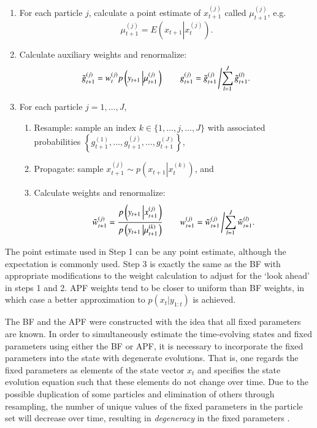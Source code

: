 \documentclass{elsarticle}
\begin{document}
\begin{enumerate}
\item For each particle $j$, calculate a point estimate of $x_{t+1}^{(j)}$ called $\mu_{t+1}^{(j)}$, e.g.
\[ \mu_{t+1}^{(j)} = E\left(x_{t+1}\left|x_t^{(j)} \right.\right). \]
\item Calculate auxiliary weights and renormalize:
\[ \tilde{g}_{t+1}^{(j)} = w_t^{(j)} p\left(y_{t+1}\left|\mu_{t+1}^{(j)}\right.\right) \qquad g_{t+1}^{(j)} = \tilde{g}_{t+1}^{(j)}\left/\sum_{l=1}^J \tilde{g}_{t+1}^{(l)}.\right. \]
\item For each particle $j=1,\ldots,J$,
	\begin{enumerate}
    \item Resample: sample an index $k\in\{1,\ldots,j,\ldots,J\}$ with associated probabilities $\left\{g_{t+1}^{(1)},\ldots,g_{t+1}^{(j)},\ldots,g_{t+1}^{(J)}\right\}$,
	\item Propagate: sample $x_{t+1}^{(j)} \sim p\left(x_{t+1}\left|x_t^{(k)}\right.\right)$, and
	\item Calculate weights and renormalize:
\[ \tilde{w}_{t+1}^{(j)} = \frac{p\left(y_{t+1}\left|x_{t+1}^{(j)}\right.\right)}{p\left(y_{t+1}\left|\mu_{t+1}^{(k)}\right.\right)} \qquad w_{t+1}^{(j)} = \tilde{w}_{t+1}^{(j)}\left/\sum_{l=1}^J \tilde{w}_{t+1}^{(l)}. \right. \]
	\end{enumerate}
\end{enumerate}

\noindent The point estimate used in Step 1 can be any point estimate, although the expectation is commonly used. Step 3 is exactly the same as the BF with appropriate modifications to the weight calculation to adjust for the `look ahead' in steps 1 and 2. APF weights tend to be closer to uniform than BF weights, in which case a better approximation to $p(x_{t}|y_{1:t})$ is achieved.

The BF and the APF were constructed with the idea that all fixed parameters are known. In order to simultaneously estimate the time-evolving states and fixed parameters using either the BF or APF, it is necessary to incorporate the fixed parameters into the state with degenerate evolutions. That is, one regards the fixed parameters as elements of the state vector $x_t$ and specifies the state evolution equation such that these elements do not change over time. Due to the possible duplication of some particles and elimination of others through resampling, the number of unique values of the fixed parameters in the particle set will decrease over time, resulting in \emph{degeneracy} in the fixed parameters \citep{Liu:West:comb:2001}.
\end{document}
